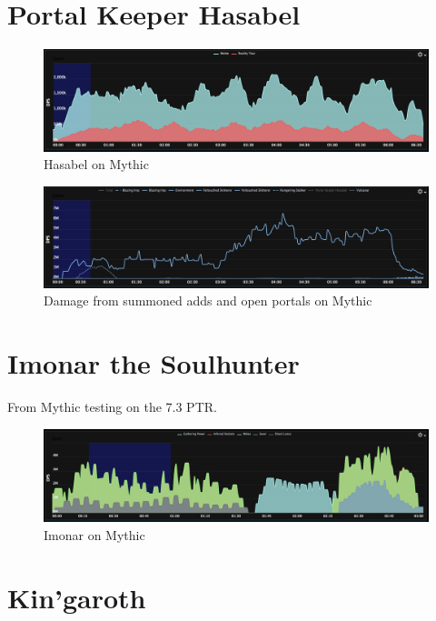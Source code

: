 \documentclass{article}
\begin{document}
\section{Portal Keeper Hasabel}

\begin{figure}[!htb]
  \includegraphics[width=\linewidth]{05-hasabel.png}
  \caption{Hasabel on Mythic}
  \label{fig:dmg5}
\end{figure}

\begin{figure}[!htb]
  \includegraphics[width=\linewidth]{05-addsandportals.png}
  \caption{Damage from summoned adds and open portals on Mythic}
  \label{fig:dmg5}
\end{figure}


\section{Imonar the Soulhunter}

From Mythic testing on the 7.3 PTR.

\begin{figure}[!htb]
  \includegraphics[width=\linewidth]{06-imonar-mythic.png}
  \caption{Imonar on Mythic}
  \label{fig:dmg6}
\end{figure}

\newpage
\section{Kin'garoth}
\end{document}
